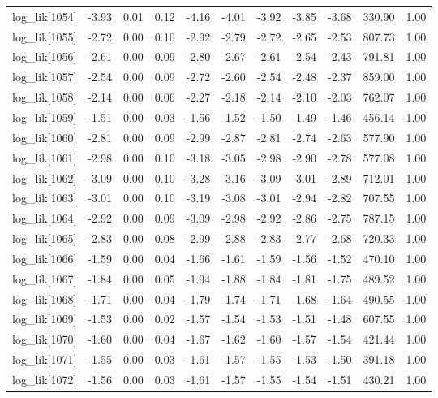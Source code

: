 \begin{table}[ht]
\begin{tabular}{rrrrrrrrrrr}
  log\_lik[1054] & -3.93 & 0.01 & 0.12 & -4.16 & -4.01 & -3.92 & -3.85 & -3.68 & 330.90 & 1.00 \\ 
  log\_lik[1055] & -2.72 & 0.00 & 0.10 & -2.92 & -2.79 & -2.72 & -2.65 & -2.53 & 807.73 & 1.00 \\ 
  log\_lik[1056] & -2.61 & 0.00 & 0.09 & -2.80 & -2.67 & -2.61 & -2.54 & -2.43 & 791.81 & 1.00 \\ 
  log\_lik[1057] & -2.54 & 0.00 & 0.09 & -2.72 & -2.60 & -2.54 & -2.48 & -2.37 & 859.00 & 1.00 \\ 
  log\_lik[1058] & -2.14 & 0.00 & 0.06 & -2.27 & -2.18 & -2.14 & -2.10 & -2.03 & 762.07 & 1.00 \\ 
  log\_lik[1059] & -1.51 & 0.00 & 0.03 & -1.56 & -1.52 & -1.50 & -1.49 & -1.46 & 456.14 & 1.00 \\ 
  log\_lik[1060] & -2.81 & 0.00 & 0.09 & -2.99 & -2.87 & -2.81 & -2.74 & -2.63 & 577.90 & 1.00 \\ 
  log\_lik[1061] & -2.98 & 0.00 & 0.10 & -3.18 & -3.05 & -2.98 & -2.90 & -2.78 & 577.08 & 1.00 \\ 
  log\_lik[1062] & -3.09 & 0.00 & 0.10 & -3.28 & -3.16 & -3.09 & -3.01 & -2.89 & 712.01 & 1.00 \\ 
  log\_lik[1063] & -3.01 & 0.00 & 0.10 & -3.19 & -3.08 & -3.01 & -2.94 & -2.82 & 707.55 & 1.00 \\ 
  log\_lik[1064] & -2.92 & 0.00 & 0.09 & -3.09 & -2.98 & -2.92 & -2.86 & -2.75 & 787.15 & 1.00 \\ 
  log\_lik[1065] & -2.83 & 0.00 & 0.08 & -2.99 & -2.88 & -2.83 & -2.77 & -2.68 & 720.33 & 1.00 \\ 
  log\_lik[1066] & -1.59 & 0.00 & 0.04 & -1.66 & -1.61 & -1.59 & -1.56 & -1.52 & 470.10 & 1.00 \\ 
  log\_lik[1067] & -1.84 & 0.00 & 0.05 & -1.94 & -1.88 & -1.84 & -1.81 & -1.75 & 489.52 & 1.00 \\ 
  log\_lik[1068] & -1.71 & 0.00 & 0.04 & -1.79 & -1.74 & -1.71 & -1.68 & -1.64 & 490.55 & 1.00 \\ 
  log\_lik[1069] & -1.53 & 0.00 & 0.02 & -1.57 & -1.54 & -1.53 & -1.51 & -1.48 & 607.55 & 1.00 \\ 
  log\_lik[1070] & -1.60 & 0.00 & 0.04 & -1.67 & -1.62 & -1.60 & -1.57 & -1.54 & 421.44 & 1.00 \\ 
  log\_lik[1071] & -1.55 & 0.00 & 0.03 & -1.61 & -1.57 & -1.55 & -1.53 & -1.50 & 391.18 & 1.00 \\ 
  log\_lik[1072] & -1.56 & 0.00 & 0.03 & -1.61 & -1.57 & -1.55 & -1.54 & -1.51 & 430.21 & 1.00 \\ 

\end{tabular}
\end{table}
